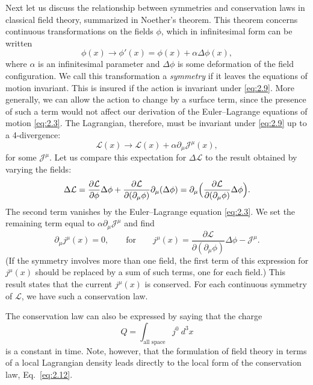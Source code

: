 Next let us discuss the relationship between symmetries and conservation
laws in classical field theory, summarized in Noether's theorem.  This
theorem concerns continuous transformations on the fields $\phi$, which in
infinitesimal form can be written
\begin{equation}
  \phi(x) \to \phi'(x) = \phi(x) + \alpha\Delta\phi(x),
  \label{eq:2.9}
\end{equation}
where $\alpha$ is an infinitesimal parameter and $\Delta\phi$ is some
deformation of the field configuration.  We call this transformation a
\emph{symmetry} if it leaves the equations of motion invariant.  This is
insured if the action is invariant under \eqref{eq:2.9}.  More generally,
we can allow the action to change by a surface term, since the presence of
such a term would not affect our derivation of the Euler--Lagrange
equations of motion \eqref{eq:2.3}.  The Lagrangian, therefore, must be
invariant under \eqref{eq:2.9} up to a 4-divergence:
\begin{equation}
  \mathcal{L}(x) \to \mathcal{L}(x) + \alpha\partial_\mu\mathcal{J}^\mu(x),
  \label{eq:2.10}
\end{equation}
for some $\mathcal{J}^\mu$.  Let us compare this expectation for
$\Delta\mathcal{L}$ to the result obtained by varying the fields:
\begin{equation}
  \Delta\mathcal{L}
  = \frac{\partial\mathcal{L}}{\partial\phi}\Delta\phi
    + \frac{\partial\mathcal{L}}{\partial(\partial_\mu\phi)}
      \partial_\mu(\Delta\phi)
  = \partial_\mu\Bigl(
      \frac{\partial\mathcal{L}}{\partial(\partial_\mu\phi)}
      \Delta\phi \Bigr).
  \label{eq:2.11}
\end{equation}
The second term vanishes by the Euler--Lagrange equation \eqref{eq:2.3}.
We set the remaining term equal to $\alpha\partial_\mu\mathcal{J}^\mu$ and
find
\begin{equation}
  \partial_\mu j^\mu(x) = 0,
  \qquad\text{for}\qquad
  j^\mu(x) = \frac{\partial\mathcal{L}}{\partial(\partial_\mu\phi)}
    \Delta\phi - \mathcal{J}^\mu .
  \label{eq:2.12}
\end{equation}
(If the symmetry involves more than one field, the first term of this
expression for $j^\mu(x)$ should be replaced by a sum of such terms, one
for each field.)  This result states that the current $j^\mu(x)$ is
conserved.  For each continuous symmetry of $\mathcal{L}$, we have such a
conservation law.

The conservation law can also be expressed by saying that the charge
\begin{equation}
  Q = \int_{\text{all space}} j^0\ d^3x
  \label{eq:2.13}
\end{equation}
is a constant in time.  Note, however, that the formulation of field
theory in terms of a local Lagrangian density leads directly to the local
form of the conservation law, Eq.~\eqref{eq:2.12}.

